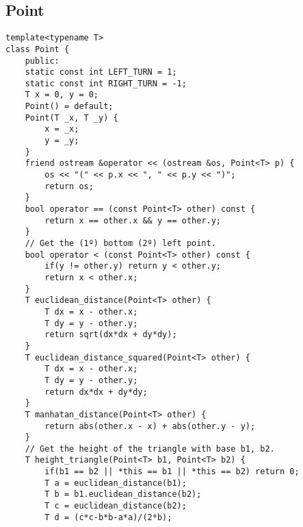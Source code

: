 \documentclass[a4paper]{article}
\begin{document}
\subsection*{Point}
\begin{multicols}{2}
\begin{verbatim}
template<typename T>
class Point {
    public:
    static const int LEFT_TURN = 1;
    static const int RIGHT_TURN = -1;
    T x = 0, y = 0;
    Point() = default;
    Point(T _x, T _y) {
        x = _x;
        y = _y;
    }
    friend ostream &operator << (ostream &os, Point<T> p) {
        os << "(" << p.x << ", " << p.y << ")";
        return os;
    }
    bool operator == (const Point<T> other) const {
        return x == other.x && y == other.y;
    }
    // Get the (1º) bottom (2º) left point.
    bool operator < (const Point<T> other) const {
        if(y != other.y) return y < other.y;
        return x < other.x;
    }
    T euclidean_distance(Point<T> other) {
        T dx = x - other.x;
        T dy = y - other.y;
        return sqrt(dx*dx + dy*dy);
    }
    T euclidean_distance_squared(Point<T> other) {
        T dx = x - other.x;
        T dy = y - other.y;
        return dx*dx + dy*dy;
    }
    T manhatan_distance(Point<T> other) {
        return abs(other.x - x) + abs(other.y - y);
    }
    // Get the height of the triangle with base b1, b2.
    T height_triangle(Point<T> b1, Point<T> b2) {
        if(b1 == b2 || *this == b1 || *this == b2) return 0;
        T a = euclidean_distance(b1);
        T b = b1.euclidean_distance(b2);
        T c = euclidean_distance(b2);
        T d = (c*c-b*b-a*a)/(2*b);
        

\end{verbatim}
\end{multicols}
\end{document}
